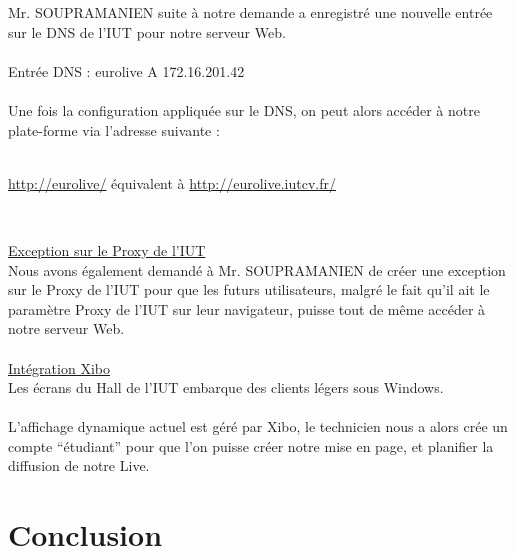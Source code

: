 \documentclass{report}
\begin{document}
    Mr. SOUPRAMANIEN suite à notre demande a enregistré une nouvelle entrée sur le DNS de l’IUT pour notre serveur Web.
    \\
    \\
    Entrée DNS :    eurolive	A	172.16.201.42
    \\
    \\
    Une fois la configuration appliquée sur le DNS, on peut alors accéder à notre plate-forme via l’adresse suivante :
    \\
    \\
    \begin{center}
    \underline{http://eurolive/} équivalent à \underline{http://eurolive.iutcv.fr/}
    \end{center}
    \\

    \hfill
    
    \underline{Exception sur le Proxy de l’IUT}\\
    
    Nous avons également demandé à Mr. SOUPRAMANIEN de créer une exception sur le Proxy de l’IUT pour que les futurs utilisateurs, malgré le fait qu’il ait le paramètre Proxy de l’IUT sur leur navigateur, puisse tout de même accéder à notre serveur Web.
    \\
    \\
    
    \underline{Intégration Xibo}\\
    
    Les écrans du Hall de l’IUT embarque des clients légers sous Windows. 
    \\
    \\
    L’affichage dynamique actuel est géré par Xibo, le technicien nous a alors crée un compte “étudiant” pour que l’on puisse créer notre mise en page, et planifier la diffusion de notre Live.

    
\chapter{Conclusion}
\end{document}
